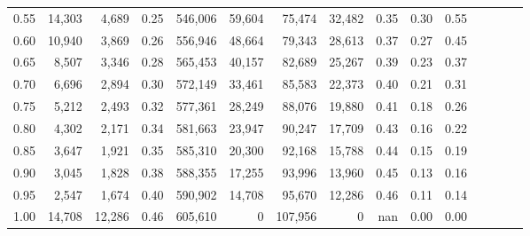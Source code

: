 \begin{tabular}{rrrcrrrrrrrrrrr}
0.55 &  14,303 &   4,689 &                                       0.25 &  546,006 &   59,604 &   75,474 &   32,482 &  0.35 &  0.30 &                         0.55 \\
0.60 &  10,940 &   3,869 &                                       0.26 &  556,946 &   48,664 &   79,343 &   28,613 &  0.37 &  0.27 &                         0.45 \\
0.65 &   8,507 &   3,346 &                                       0.28 &  565,453 &   40,157 &   82,689 &   25,267 &  0.39 &  0.23 &                         0.37 \\
0.70 &   6,696 &   2,894 &                                       0.30 &  572,149 &   33,461 &   85,583 &   22,373 &  0.40 &  0.21 &                         0.31 \\
0.75 &   5,212 &   2,493 &                                       0.32 &  577,361 &   28,249 &   88,076 &   19,880 &  0.41 &  0.18 &                         0.26 \\
0.80 &   4,302 &   2,171 &                                       0.34 &  581,663 &   23,947 &   90,247 &   17,709 &  0.43 &  0.16 &                         0.22 \\
0.85 &   3,647 &   1,921 &                                       0.35 &  585,310 &   20,300 &   92,168 &   15,788 &  0.44 &  0.15 &                         0.19 \\
0.90 &   3,045 &   1,828 &                                       0.38 &  588,355 &   17,255 &   93,996 &   13,960 &  0.45 &  0.13 &                         0.16 \\
0.95 &   2,547 &   1,674 &                                       0.40 &  590,902 &   14,708 &   95,670 &   12,286 &  0.46 &  0.11 &                         0.14 \\
1.00 &  14,708 &  12,286 &                                       0.46 &  605,610 &        0 &  107,956 &        0 &   nan &  0.00 &                         0.00 \\
\bottomrule
\end{tabular}

